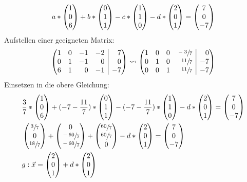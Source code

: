 \begin{lsg}{}
\begin{align*}
		a*\begin{pmatrix} 1\\0\\6 \end{pmatrix}+b*\begin{pmatrix} 0\\1\\1 \end{pmatrix}-c*\begin{pmatrix} 1\\1\\0 \end{pmatrix}-d*\begin{pmatrix} 2\\0\\1 \end{pmatrix}=\begin{pmatrix} 7\\0\\-7 \end{pmatrix}
	\end{align*}
	Aufstellen einer geeigneten Matrix:
	\begin{align*}
		\ematrix{rrrr|r}
		{1 & 0 & -1 & -2 & 7\\
		0 & 1 & -1 & 0 & 0\\
		6 & 1 & 0 & -1 & -7}\rightsquigarrow
		\ematrix{rrrr|r}
		{1 & 0 & 0 & \sfrac{-3}{7} & 0\\
		0 & 1 & 0 & \sfrac{11}{7} & -7\\
		0 & 0 & 1 & \sfrac{11}{7} & -7}
	\end{align*}
	Einsetzen in die obere Gleichung:
	\begin{align*}
		&\frac37*\begin{pmatrix} 1\\0\\6 \end{pmatrix}+(-7-\frac{11}{7})*\begin{pmatrix} 0\\1\\1 \end{pmatrix}-(-7-\frac{11}{7})*\begin{pmatrix} 1\\1\\0 \end{pmatrix}-d*\begin{pmatrix} 2\\0\\1 \end{pmatrix}=\begin{pmatrix} 7\\0\\-7 \end{pmatrix}\\
		&\begin{pmatrix} \sfrac37\\0\\\sfrac{18}{7} \end{pmatrix}+\begin{pmatrix} 0\\\sfrac{-60}{7}\\\sfrac{-60}{7} \end{pmatrix}+\begin{pmatrix} \sfrac{60}{7}\\\sfrac{60}{7}\\0 \end{pmatrix}-d*\begin{pmatrix} 2\\0\\1 \end{pmatrix}=\begin{pmatrix} 7\\0\\-7 \end{pmatrix}\\
		&g: \vec x = \begin{pmatrix} 2\\0\\1 \end{pmatrix}+d*\begin{pmatrix} 2\\0\\1 \end{pmatrix}
	\end{align*}

\end{lsg}


